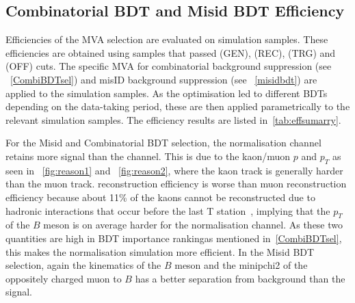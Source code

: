 
\subsection{Combinatorial BDT and Misid BDT Efficiency}
 Efficiencies of the MVA selection are evaluated on simulation samples. These efficiencies are obtained using samples that passed (GEN), (REC), (TRG) and (OFF) cuts. The specific MVA for combinatorial background suppression (see ~\autoref{CombiBDTsel}) and misID background suppression (see ~\autoref{misidbdt}) are applied to the simulation samples. As the optimisation led to different BDTs depending on the data-taking period, these are then applied parametrically to the relevant simulation samples. The efficiency results are listed in~\autoref{tab:effsumarry}.

For the Misid and Combinatorial BDT selection, the normalisation \bjpsimumuk channel retains more signal than the \Bmumumu channel. This is due to the kaon/muon $p$ and $p_{T}$ \DIFdelbegin {}\DIFdelend \DIFaddbegin {}\DIFaddend as seen in ~\autoref{fig:reason1} and ~\autoref{fig:reason2}, where the kaon track is generally harder than the muon track. \DIFdelbegin {}\DIFdelend \DIFaddbegin {}\DIFaddend reconstruction efficiency is worse than \DIFaddbegin {}\DIFaddend muon reconstruction efficiency because about 11\% of the kaons cannot be reconstructed due to hadronic interactions that occur before the last T station~\cite{LHCb-DP-2013-002}, implying that the $p_{T}$ of the $B$ meson is on average harder for the normalisation channel. As these two quantities are high in \DIFaddbegin {}\DIFaddend BDT importance ranking\DIFaddbegin \DIFadd{, }\DIFaddend as mentioned in~\autoref{CombiBDTsel}, this makes  the normalisation simulation more efficient. In the Misid BDT selection, again the kinematics of the $B$ meson and the \gls{minipchi2} of the oppositely charged muon to \DIFaddbegin {}\DIFaddend $B$ has a better separation from background than the signal.

